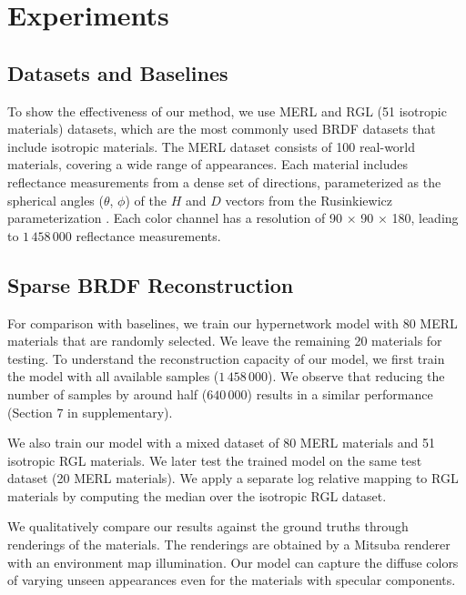 \section{Experiments}\label{sec:exp}



\subsection{Datasets and Baselines}

To show the effectiveness of our method, we use MERL \cite{Matusik2003jul} and RGL (51 isotropic materials) \cite{dupuy2018adaptive} datasets, which are the most commonly used BRDF datasets that include isotropic materials. The MERL dataset \cite{Matusik2003jul} consists of 100 real-world materials, covering a wide range of appearances. Each material includes reflectance measurements from a dense set of directions, parameterized as the spherical angles ($\theta$, $\phi$) of the $H$ and $D$ vectors from the Rusinkiewicz parameterization \cite{rusinkiewicz1998new}. Each color channel has a resolution of 90 × 90 × 180, leading to $1\,458\,000$ reflectance measurements. 



\subsection{Sparse BRDF Reconstruction}\label{sec:brdf_rec}
 For comparison with baselines, we train our hypernetwork model with 80 MERL materials that are randomly selected. We leave the remaining 20 materials for testing. To understand the reconstruction capacity of our model, we first train the model with all available samples ($1\,458\,000$). We observe that reducing the number of samples by around half ($640\,000$) results in a similar performance (Section 7 in supplementary). 

We also train our model with a mixed dataset of 80 MERL materials and 51 isotropic RGL materials. We later test the trained model on the same test dataset (20 MERL materials). We apply a separate log relative mapping to RGL materials by computing the median over the isotropic RGL dataset.
 
 We qualitatively compare our results against the ground truths through renderings of the materials. The renderings are obtained by a Mitsuba renderer with an environment map illumination. Our model can capture the diffuse colors of varying unseen appearances even for the materials with specular components. 



